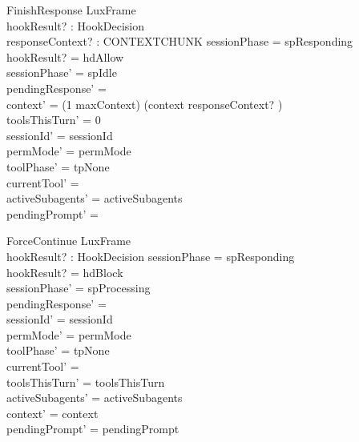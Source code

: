\documentclass[a4paper,10pt,fleqn]{article}
\begin{document}
\begin{schema}{FinishResponse}
  LuxFrame \\
  hookResult? : HookDecision \\
  responseContext? : CONTEXTCHUNK
  \where
  sessionPhase = spResponding \\
  hookResult? = hdAllow \\
  sessionPhase' = spIdle \\
  pendingResponse' = \emptyset \\
  context' = (1 \upto maxContext) \dres (context \cat \langle responseContext? \rangle) \\
  toolsThisTurn' = 0 \\
  sessionId' = sessionId \\
  permMode' = permMode \\
  toolPhase' = tpNone \\
  currentTool' = \emptyset \\
  activeSubagents' = activeSubagents \\
  pendingPrompt' = \emptyset
\end{schema}

\begin{schema}{ForceContinue}
  LuxFrame \\
  hookResult? : HookDecision
  \where
  sessionPhase = spResponding \\
  hookResult? = hdBlock \\
  sessionPhase' = spProcessing \\
  pendingResponse' = \emptyset \\
  sessionId' = sessionId \\
  permMode' = permMode \\
  toolPhase' = tpNone \\
  currentTool' = \emptyset \\
  toolsThisTurn' = toolsThisTurn \\
  activeSubagents' = activeSubagents \\
  context' = context \\
  pendingPrompt' = pendingPrompt
\end{schema}
\end{document}

